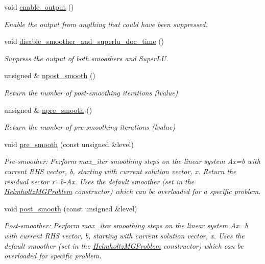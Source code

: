 \begin{DoxyCompactItemize}
void \hyperlink{classoomph_1_1HelmholtzMGPreconditioner_a91ba5204f62cf8df208d51025cb56fba}{enable\+\_\+output} ()
\begin{DoxyCompactList}\small\item\em Enable the output from anything that could have been suppressed. \end{DoxyCompactList}\item 
void \hyperlink{classoomph_1_1HelmholtzMGPreconditioner_a68e5048a3e62dac7036e36eb1e514b95}{disable\+\_\+smoother\+\_\+and\+\_\+superlu\+\_\+doc\+\_\+time} ()
\begin{DoxyCompactList}\small\item\em Suppress the output of both smoothers and Super\+LU. \end{DoxyCompactList}\item 
unsigned \& \hyperlink{classoomph_1_1HelmholtzMGPreconditioner_aba2f9f9f2b973db3863a4c3c34c63625}{npost\+\_\+smooth} ()
\begin{DoxyCompactList}\small\item\em Return the number of post-\/smoothing iterations (lvalue) \end{DoxyCompactList}\item 
unsigned \& \hyperlink{classoomph_1_1HelmholtzMGPreconditioner_aac39db0b4c814ddb7b7137927477b7d2}{npre\+\_\+smooth} ()
\begin{DoxyCompactList}\small\item\em Return the number of pre-\/smoothing iterations (lvalue) \end{DoxyCompactList}\item 
void \hyperlink{classoomph_1_1HelmholtzMGPreconditioner_a045e772c0854d1410696a33f0459eec8}{pre\+\_\+smooth} (const unsigned \&level)
\begin{DoxyCompactList}\small\item\em Pre-\/smoother\+: Perform \textquotesingle{}max\+\_\+iter\textquotesingle{} smoothing steps on the linear system Ax=b with current R\+HS vector, b, starting with current solution vector, x. Return the residual vector r=b-\/\+Ax. Uses the default smoother (set in the \hyperlink{classoomph_1_1HelmholtzMGProblem}{Helmholtz\+M\+G\+Problem} constructor) which can be overloaded for a specific problem. \end{DoxyCompactList}\item 
void \hyperlink{classoomph_1_1HelmholtzMGPreconditioner_a7512c2c6c3dec57da2a2e4d7422f5bd1}{post\+\_\+smooth} (const unsigned \&level)
\begin{DoxyCompactList}\small\item\em Post-\/smoother\+: Perform max\+\_\+iter smoothing steps on the linear system Ax=b with current R\+HS vector, b, starting with current solution vector, x. Uses the default smoother (set in the \hyperlink{classoomph_1_1HelmholtzMGProblem}{Helmholtz\+M\+G\+Problem} constructor) which can be overloaded for specific problem. \end{DoxyCompactList}\item 

\end{DoxyCompactItemize}
